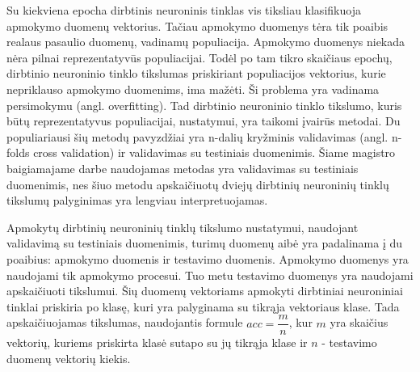 Su kiekviena epocha dirbtinis neuroninis tinklas vis tiksliau klasifikuoja apmokymo duomenų vektorius. Tačiau apmokymo duomenys tėra tik poaibis realaus pasaulio duomenų, vadinamų populiacija. Apmokymo duomenys niekada nėra pilnai reprezentatyvūs populiacijai. Todėl po tam tikro skaičiaus epochų, dirbtinio neuroninio tinklo tikslumas priskiriant populiacijos vektorius, kurie nepriklauso apmokymo duomenims, ima mažėti. Ši problema yra vadinama persimokymu (angl. overfitting). Tad dirbtinio neuroninio tinklo tikslumo, kuris būtų reprezentatyvus populiacijai, nustatymui, yra taikomi įvairūs metodai. Du populiariausi šių metodų pavyzdžiai yra n-dalių kryžminis validavimas (angl. n-folds cross validation) ir validavimas su testiniais duomenimis. Šiame magistro baigiamajame darbe naudojamas metodas yra validavimas su testiniais duomenimis, nes šiuo metodu apskaičiuotų dviejų dirbtinių neuroninių tinklų tikslumų palyginimas yra lengviau interpretuojamas.

Apmokytų dirbtinių neuroninių tinklų tikslumo nustatymui, naudojant validavimą su testiniais duomenimis, turimų duomenų aibė yra padalinama į du poaibius: apmokymo duomenis ir testavimo duomenis.  Apmokymo duomenys yra naudojami tik apmokymo procesui. Tuo metu testavimo duomenys yra naudojami apskaičiuoti tikslumui. Šių duomenų vektoriams apmokyti dirbtiniai neuroniniai tinklai priskiria po klasę, kuri yra palyginama su tikrąja vektoriaus klase. Tada apskaičiuojamas tikslumas, naudojantis formule $acc = \dfrac{m}{n}$, kur $m$ yra skaičius vektorių, kuriems priskirta klasė sutapo su jų tikrąja klase ir $n$ - testavimo duomenų vektorių kiekis.
